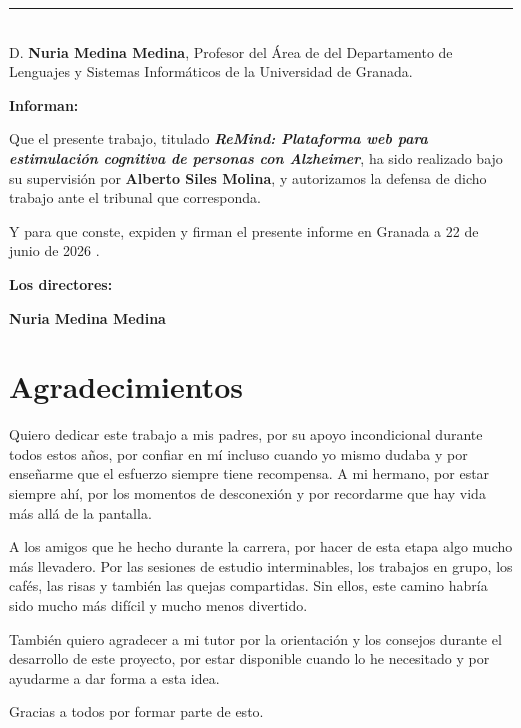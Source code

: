 \noindent\rule[-1ex]{\textwidth}{2pt}\\[4.5ex]

D. \textbf{Nuria Medina Medina}, Profesor del Área de  del Departamento de Lenguajes y Sistemas Informáticos de la Universidad de Granada.

\vspace{0.5cm}

\textbf{Informan:}

\vspace{0.5cm}

Que el presente trabajo, titulado \textit{\textbf{ReMind: Plataforma web para estimulación cognitiva de personas con Alzheimer}},
ha sido realizado bajo su supervisión por \textbf{Alberto Siles Molina}, y autorizamos la defensa de dicho trabajo ante el tribunal
que corresponda.

\vspace{0.5cm}

Y para que conste, expiden y firman el presente informe en Granada a 22 de junio de 2026 .

\vspace{1cm}

\textbf{Los directores:}

\vspace{5cm}

\noindent \textbf{Nuria Medina Medina}

\chapter*{Agradecimientos}
\thispagestyle{empty}

Quiero dedicar este trabajo a mis padres, por su apoyo incondicional durante todos estos años, por confiar en mí incluso cuando yo mismo dudaba y por enseñarme que el esfuerzo siempre tiene recompensa. A mi hermano, por estar siempre ahí, por los momentos de desconexión y por recordarme que hay vida más allá de la pantalla.

A los amigos que he hecho durante la carrera, por hacer de esta etapa algo mucho más llevadero. Por las sesiones de estudio interminables, los trabajos en grupo, los cafés, las risas y también las quejas compartidas. Sin ellos, este camino habría sido mucho más difícil y mucho menos divertido.

También quiero agradecer a mi tutor por la orientación y los consejos durante el desarrollo de este proyecto, por estar disponible cuando lo he necesitado y por ayudarme a dar forma a esta idea.

Gracias a todos por formar parte de esto.

